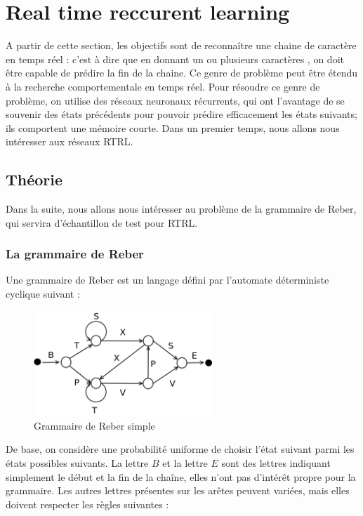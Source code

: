 
\chapter{Real time reccurent learning}

A partir de cette section, les objectifs sont de reconnaître une chaine de caractère en temps réel : c'est à dire que en donnant un ou plusieurs caractères , on doit être capable de prédire la fin de la chaine.
Ce genre de problème peut être étendu à la recherche comportementale en temps réel.
Pour résoudre ce genre de problème, on utilise des réseaux neuronaux récurrents, qui ont l'avantage de se souvenir des états précédents pour pouvoir prédire efficacement les états suivants; ils comportent une mémoire courte.
Dans un premier temps, nous allons nous intéresser aux réseaux RTRL.

\section{Théorie}

Dans la suite, nous allons nous intéresser au problème de la grammaire de Reber, qui servira d'échantillon de test pour RTRL.

\subsection{La grammaire de Reber}

Une grammaire de Reber est un langage défini par l'automate déterministe cyclique suivant :

\begin{figure}[!ht]
\begin{center}
\includegraphics[width=0.6\textwidth]{images/reberGrammar.png}
\end{center}
\caption{Grammaire de Reber simple}
\end{figure}


De base, on considère une probabilité uniforme de choisir l'état suivant parmi les états possibles suivants.
La lettre $B$ et la lettre $E$ sont des lettres indiquant simplement le début et la fin de la chaîne, elles n'ont pas d'intérêt propre pour la grammaire.
Les autres lettres présentes sur les arêtes peuvent variées, mais elles doivent respecter les règles suivantes :

